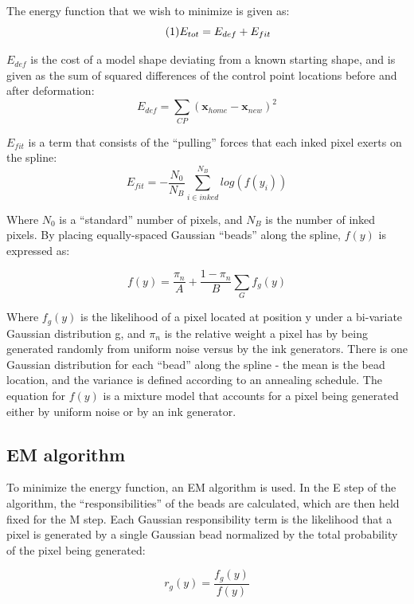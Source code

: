 \documentclass[oribibl]{llncs}
\newcommand\numberthis{\addtocounter{equation}{1}\tag{\theequation}} %
\begin{document}
The energy function that we wish to minimize is given as:
\begin{equation*}
\numberthis \label{eq:E_total}
    E_{tot} = E_{def} + E_{fit}
\end{equation*}

$E_{def}$ is the cost of a model shape deviating from a known starting shape, and is given as the sum of squared differences of the control point locations before and after deformation:
$$ E_{def} =  \sum_{CP}{(\textbf{x}_{home} - \textbf{x}_{new})^2}$$ 

$E_{fit}$ is a term that consists of the ``pulling'' forces that each inked pixel exerts on the spline:
$$ E_{fit} = -\frac{N_0}{N_B}\sum_{i \in inked}^{N_B}{log(f(y_i))}  $$

Where $N_0$ is a ``standard'' number of pixels, and $N_B$ is the number of inked pixels.
By placing equally-spaced Gaussian ``beads'' along the spline, $f(y)$ is expressed as:

$$ f(y) =  \frac{\pi_n}{A} + \frac{1-\pi_n}{B}\sum_{G}{f_g(y)}$$ 

Where $f_g(y)$ is the likelihood of a pixel located at position y under a bi-variate Gaussian distribution g, and $\pi_n$ is the relative weight a pixel has by being generated randomly from uniform noise versus by the ink generators. 
There is one Gaussian distribution for each ``bead'' along the spline - the mean is the bead location, and the variance is defined according to an annealing schedule.
The equation for $f(y)$ is a mixture model that accounts for a pixel being generated either by uniform noise or by an ink generator.

\subsection{EM algorithm}
To minimize the energy function, an EM algorithm is used. In the E step of the algorithm, the ``responsibilities'' of the beads are calculated, which are then held fixed for the M step.
Each Gaussian responsibility term is the likelihood that a pixel is generated by a single Gaussian bead normalized by the total probability of the pixel being generated:

$$ r_g(y) = \frac{f_g(y)}{f(y)} $$
\end{document}
